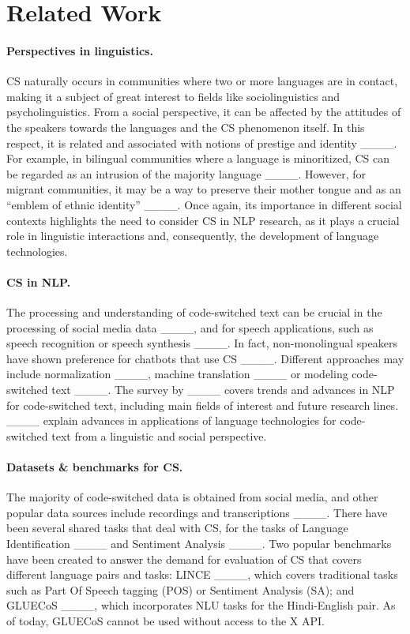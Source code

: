 \section{Related Work}
\label{sec:related-work}
\paragraph{Perspectives in linguistics.}CS naturally occurs in communities where two or more languages are in contact, making it a subject of great interest to fields like sociolinguistics and psycholinguistics. From a social perspective, it can be affected by the attitudes of the speakers towards the languages and the CS phenomenon itself. In this respect, it is related and associated with notions of prestige and identity ____. For example, in bilingual communities where a language is minoritized, CS can be regarded as an intrusion of the majority language ____. However, for migrant communities, it may be a way to preserve their mother tongue and as an ``emblem of ethnic identity'' ____. Once again, its importance in different social contexts highlights the need to consider CS in NLP research, as it plays a crucial role in linguistic interactions and, consequently, the development of language technologies.
\paragraph{CS in NLP.} The processing and understanding of code-switched text can be crucial in the processing of social media data ____, and for speech applications, such as speech recognition or speech synthesis ____. In fact, non-monolingual speakers have shown preference for chatbots that use CS ____. Different approaches may include normalization ____, machine translation ____ or modeling code-switched text ____. The survey by ____ covers trends and advances in NLP for code-switched text, including main fields of interest and future research lines. ____ explain advances in applications of language technologies for code-switched text from a linguistic and social perspective. 

\paragraph{Datasets \& benchmarks for CS.} The majority of code-switched data is obtained from social media, and other popular data sources include recordings and transcriptions ____. There have been several shared tasks that deal with CS, for the tasks of Language Identification ____ and Sentiment Analysis ____. Two popular benchmarks have been created to answer the demand for evaluation of CS that covers different language pairs and tasks: LINCE ____, which covers traditional tasks such as Part Of Speech tagging (POS) or Sentiment Analysis (SA); and GLUECoS ____, which incorporates NLU tasks for the Hindi-English pair. As of today, GLUECoS cannot be used without access to the X API.

